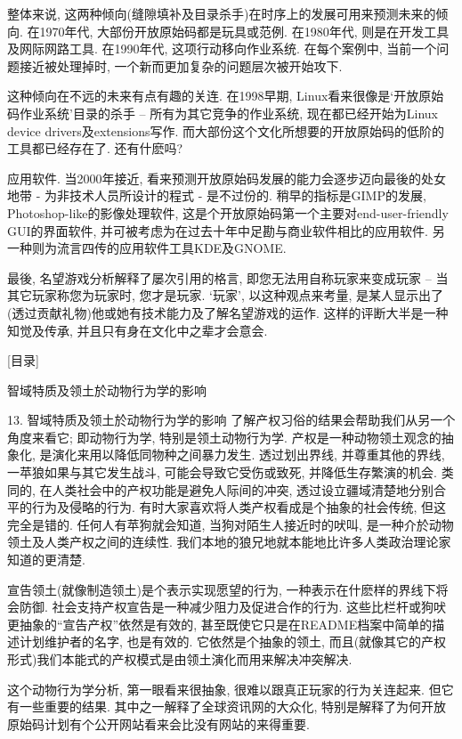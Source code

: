 \documentclass[a4paper,12pt,UTF8,twoside]{ctexbook}
\begin{document}
整体来说, 这两种倾向(缝隙填补及目录杀手)在时序上的发展可用来预测未来的倾向. 在1970年代, 大部份开放原始码都是玩具或范例. 在1980年代, 则是在开发工具及网际网路工具.  在1990年代, 这项行动移向作业系统. 在每个案例中, 当前一个问题接近被处理掉时, 一个新而更加复杂的问题层次被开始攻下.

这种倾向在不远的未来有点有趣的关连. 在1998早期, Linux看来很像是`开放原始码作业系统'目录的杀手 -- 所有为其它竞争的作业系统, 现在都已经开始为Linux device drivers及extensions写作. 而大部份这个文化所想要的开放原始码的低阶的工具都已经存在了. 还有什麽吗?

应用软件. 当2000年接近, 看来预测开放原始码发展的能力会逐步迈向最後的处女地带 - 为非技术人员所设计的程式 - 是不过份的. 稍早的指标是GIMP的发展, Photoshop-like的影像处理软件, 这是个开放原始码第一个主要对end-user-friendly GUI的界面软件, 并可被考虑为在过去十年中足勘与商业软件相比的应用软件. 另一种则为流言四传的应用软件工具KDE及GNOME.

最後, 名望游戏分析解释了屡次引用的格言, 即您无法用自称玩家来变成玩家 -- 当其它玩家称您为玩家时, 您才是玩家. `玩家', 以这种观点来考量, 是某人显示出了(透过贡献礼物)他或她有技术能力及了解名望游戏的运作.  这样的评断大半是一种知觉及传承, 并且只有身在文化中之辈才会意会.

[目录]

智域特质及领土於动物行为学的影响

13. 智域特质及领土於动物行为学的影响
了解产权习俗的结果会帮助我们从另一个角度来看它; 即动物行为学, 特别是领土动物行为学.
产权是一种动物领土观念的抽象化, 是演化来用以降低同物种之间暴力发生. 透过划出界线, 并尊重其他的界线, 一苹狼如果与其它发生战斗, 可能会导致它受伤或致死, 并降低生存繁演的机会.
类同的, 在人类社会中的产权功能是避免人际间的冲突, 透过设立疆域清楚地分别合平的行为及侵略的行为. 有时大家喜欢将人类产权看成是个抽象的社会传统, 但这完全是错的. 任何人有苹狗就会知道, 当狗对陌生人接近时的吠叫, 是一种介於动物领土及人类产权之间的连续性. 我们本地的狼兄地就本能地比许多人类政治理论家知道的更清楚.

宣告领土(就像制造领土)是个表示实现愿望的行为, 一种表示在什麽样的界线下将会防御. 社会支持产权宣告是一种减少阻力及促进合作的行为. 这些比栏杆或狗吠更抽象的``宣告产权''依然是有效的, 甚至既使它只是在README档案中简单的描述计划维护者的名字, 也是有效的. 它依然是个抽象的领土, 而且(就像其它的产权形式)我们本能式的产权模式是由领土演化而用来解决冲突解决.

这个动物行为学分析, 第一眼看来很抽象, 很难以跟真正玩家的行为关连起来. 但它有一些重要的结果.  其中之一解释了全球资讯网的大众化, 特别是解释了为何开放原始码计划有个公开网站看来会比没有网站的来得重要.
\end{document}
